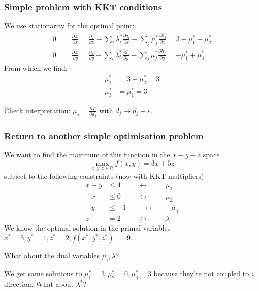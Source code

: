 \documentclass[10pt,aspectratio=169,dvipsnames]{beamer}
\def\l{\lambda}
\def\m{\mu}
\def\d{\partial}
\def\cL{\mathcal{L}}
\begin{document}
\begin{frame}
  \frametitle{Simple problem with KKT conditions}

  We use stationarity for the optimal point:
  \begin{align*}
    0 & = \frac{\d \cL}{\d x } =   \frac{\d f}{\d x} - \sum_i \l_i^* \frac{\d g_i}{\d x}  - \sum_j \m_j^* \frac{\d h_j}{\d x} = 3 - \m_1^* + \m_2^* \\
    0 & = \frac{\d \cL}{\d y } =   \frac{\d f}{\d y} - \sum_i \l_i^* \frac{\d g_i}{\d y}  - \sum_j \m_j^* \frac{\d h_j}{\d y} = - \m_1^* + \m_3^*
  \end{align*}
  From which we find:
  \begin{align*}
    \m_1^* & = 3 - \m_2^* = 3 \\
    \m_3^* & = \m_1^* = 3
  \end{align*}

  Check interpretation: $\m_j = \frac{\d \cL}{\d d_j}$ with $d_j \to d_j + \varepsilon$.
\end{frame}




\begin{frame}
  \frametitle{Return to another simple optimisation problem}

  We want to find the maximum of this function in the $x-y-z$ space
  \begin{equation*}
    \max_{x,y,z\in \mathbb{R}} f(x,y) = 3x + 5z
  \end{equation*}
  subject to the following constraints (now with KKT multipliers)
  \begin{align*}
    x + y & \leq 4  \hspace{1cm}\leftrightarrow\hspace{1cm} \m_1 \\
    -x & \leq 0  \hspace{1cm}\leftrightarrow\hspace{1cm} \m_2\\
    -y & \leq -1  \hspace{1cm}\leftrightarrow\hspace{1cm} \m_3 \\
    z & = 2  \hspace{1cm}\leftrightarrow\hspace{1cm} \l
  \end{align*}
  We know the optimal solution in the \alert{primal variables} $x^* = 3, y^* = 1, z^* = 2, f(x^*,y^*,z^*) = 19$.

  What about the \alert{dual variables} $\m_i,\l$?

  We get same solutions to $\m_1^* = 3, \m_2^* = 0, \m_3^* =3$ because they're not coupled to $z$ direction. What about $\l^*$?

\end{frame}
\end{document}
